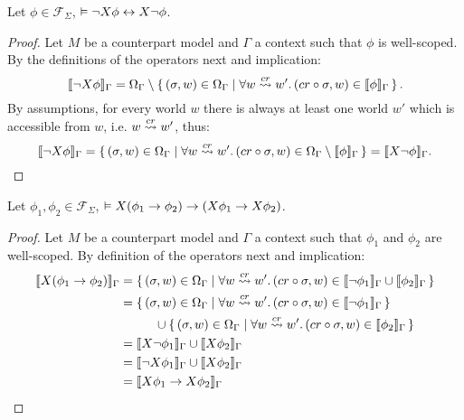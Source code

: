 \begin{lemma}\label{lem:negnextdist}
  Let $\phi \in \mathcal{F}_\Sigma$, $\vDash \neg X{\phi} \leftrightarrow X{\neg\phi}$.
\end{lemma}
\begin{proof}
  Let $M$ be a counterpart model and $\Gamma$ a context such that $\phi$ is well-scoped.
  By the definitions of the operators next and implication:
  \[
    \llbracket \neg X{\phi} \rrbracket_{\Gamma} = \Omega_{\Gamma} \setminus \set{(\sigma, w) \in \Omega_{\Gamma} |
    \forall {w \overset{cr}{\rightsquigarrow} w'} \ldotp {(cr \circ \sigma, w) \in \llbracket \phi \rrbracket_{\Gamma}}}.
  \]
  By assumptions, for every world $w$ there is always at least one world $w'$ which is accessible from $w$,
  i.e. $w \overset{cr}{\rightsquigarrow} w'$, thus:
  \[
    \llbracket \neg X{\phi} \rrbracket_{\Gamma} = \set{(\sigma, w) \in \Omega_{\Gamma} | \forall {w \overset{cr}{\rightsquigarrow} w'} \ldotp {(cr \circ
    \sigma, w) \in \Omega_{\Gamma} \setminus \llbracket \phi \rrbracket_{\Gamma}}} = \llbracket X{\neg\phi} \rrbracket_{\Gamma}.
  \]
\end{proof}

\begin{lemma}\label{lem:impnextdist}
  Let $\phi_1, \phi_2 \in \mathcal{F}_\Sigma$, $\vDash X{(\phi_1 \to \phi_2)} \to (X{\phi_1} \to
  X{\phi_2})$.
\end{lemma}
\begin{proof}
  Let $M$ be a counterpart model and $\Gamma$ a context such that $\phi_1$ and $\phi_2$ are well-scoped.
  By definition of the operators next and implication:
  \[
    \begin{split}
      \llbracket X{(\phi_1 \to \phi_2)} \rrbracket_{\Gamma} &=
        \set{(\sigma, w) \in \Omega_{\Gamma} | \forall {w \overset{cr}{\rightsquigarrow} w'} \ldotp {(cr \circ \sigma, w) \in
        \llbracket \neg\phi_1 \rrbracket_{\Gamma} \cup \llbracket \phi_2 \rrbracket_{\Gamma}}} \\
        &= \set{(\sigma, w) \in \Omega_{\Gamma} | \forall {w \overset{cr}{\rightsquigarrow} w'} \ldotp {(cr \circ \sigma, w) \in
        \llbracket \neg\phi_1 \rrbracket_{\Gamma}}} \\
        &\phantom{= }\qquad \cup \set{(\sigma, w) \in \Omega_{\Gamma} | \forall {w \overset{cr}{\rightsquigarrow} w'} \ldotp {(cr \circ
        \sigma, w) \in \llbracket \phi_2 \rrbracket_{\Gamma}}} \\
        &= \llbracket X{\neg\phi_1} \rrbracket_{\Gamma} \cup \llbracket X{\phi_2} \rrbracket_{\Gamma} \\
        &= \llbracket \neg X{\phi_1} \rrbracket_{\Gamma} \cup \llbracket X{\phi_2} \rrbracket_{\Gamma} \\
        &= \llbracket X{\phi_1} \to X{\phi_2} \rrbracket_{\Gamma} \\
    \end{split}
  \]
\end{proof}

